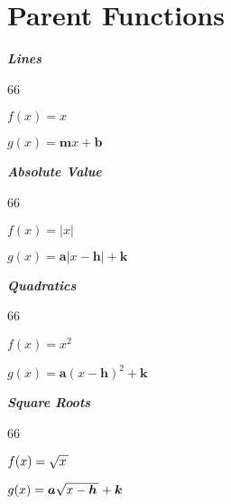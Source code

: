 \section{Parent Functions}

\vfil
{
    \begin{minipage}{0.2\textwidth}
        \begin{center}
            {\bfseries\itshape Lines}\\
            \begin{myTikzpictureGrid}{0.25} {6}{6}
                \tkzFct[ solid, very thick, samples=100, domain=-10:10,]{\x}
            \end{myTikzpictureGrid}
        \end{center}\vspace{-1\onelineskip}
        {$f(x) = x$}

        {$g(x) = \bm{m}x + \bm{b}$}
    \end{minipage}
}
\hfill 
{
    \begin{minipage}{0.2\textwidth}
        \begin{center}
            {\bfseries\itshape Absolute Value}\\
            \begin{myTikzpictureGrid}{0.25} {6}{6}
            \end{myTikzpictureGrid}
        \end{center}\vspace{-1\onelineskip}
        {$f(x) = |x|$}

        {$g(x) = \bm{a}|x-\bm{h}| + \bm{k}$}
    \end{minipage}
}
\hfill 
{
    \begin{minipage}{0.2\textwidth}
        \begin{center}
            {\bfseries\itshape Quadratics}\\
            \begin{myTikzpictureGrid}{0.25} {6}{6}
            \end{myTikzpictureGrid}
        \end{center}\vspace{-1\onelineskip}
        {$f(x) = x^2$}

        {$g(x) = \bm{a}(x-\bm{h})^2 + \bm{k}$}
    \end{minipage}
}
\hfill 
{
    \begin{minipage}{0.2\textwidth}
        \begin{center}
            {\bfseries\itshape Square Roots}\\
            \begin{myTikzpictureGrid}{0.25} {6}{6}
            \end{myTikzpictureGrid}
        \end{center}\vspace{-1\onelineskip}
        {$f(x) = \myRoot{x}$}

        {$g(x) = \bm{a}\myRoot{x-\bm{h}} + \bm{k}$}
    \end{minipage}
}
